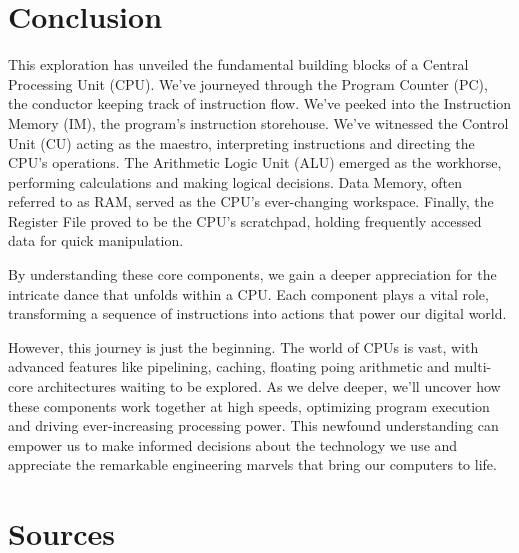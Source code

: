 \documentclass[9pt,a4paper,twoside]{tau}
\begin{document}
\section{Conclusion}
\justifying

This exploration has unveiled the fundamental building blocks of a Central Processing Unit (CPU). We've journeyed through the Program Counter (PC), the conductor keeping track of instruction flow. We've peeked into the Instruction Memory (IM), the program's instruction storehouse. We've witnessed the Control Unit (CU) acting as the maestro, interpreting instructions and directing the CPU's operations. The Arithmetic Logic Unit (ALU) emerged as the workhorse, performing calculations and making logical decisions. Data Memory, often referred to as RAM, served as the CPU's ever-changing workspace. Finally, the Register File proved to be the CPU's scratchpad, holding frequently accessed data for quick manipulation.

By understanding these core components, we gain a deeper appreciation for the intricate dance that unfolds within a CPU. Each component plays a vital role, transforming a sequence of instructions into actions that power our digital world.

However, this journey is just the beginning. The world of CPUs is vast, with advanced features like pipelining, caching, floating poing arithmetic and multi-core architectures waiting to be explored. As we delve deeper, we'll uncover how these components work together at high speeds, optimizing program execution and driving ever-increasing processing power. This newfound understanding can empower us to make informed decisions about the technology we use and appreciate the remarkable engineering marvels that bring our computers to life.


\section{Sources}
\end{document}
